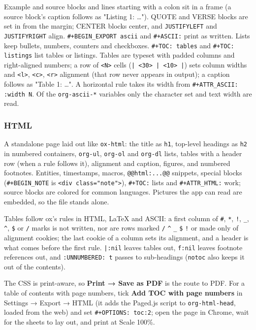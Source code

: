 \documentclass[11pt]{article}
\begin{document}
Example and source blocks and lines starting with a colon sit in a frame (a source block's caption follows as "Listing 1: …"). QUOTE and VERSE blocks are set in from the margin; CENTER blocks center, and \texttt{JUSTIFYLEFT} and \texttt{JUSTIFYRIGHT} align. \texttt{\#+BEGIN\_EXPORT ascii} and \texttt{\#+ASCII:} print as written. Lists keep bullets, numbers, counters and checkboxes. \texttt{\#+TOC: tables} and \texttt{\#+TOC: listings} list tables or listings. Tables are typeset with padded columns and right-aligned numbers; a row of \texttt{<N>} cells (\texttt{| <30> | <10> |}) sets column widths and \texttt{<l>}, \texttt{<c>}, \texttt{<r>} alignment (that row never appears in output); a caption follows as "Table 1: …". A horizontal rule takes its width from \texttt{\#+ATTR\_ASCII: :width N}. Of the \texttt{org-ascii-*} variables only the character set and text width are read.

\subsubsection{HTML}
\label{sec:org8a98de1}

A standalone page laid out like \texttt{ox-html}: the title as \texttt{h1}, top-level headings as \texttt{h2} in numbered containers, \texttt{org-ul}, \texttt{org-ol} and \texttt{org-dl} lists, tables with a header row (when a rule follows it), alignment and caption, figures, and numbered footnotes. Entities, timestamps, macros, \texttt{@@html:...@@} snippets, special blocks (\texttt{\#+BEGIN\_NOTE} is \texttt{<div class="note">}), \texttt{\#+TOC:} lists and \texttt{\#+ATTR\_HTML:} work; source blocks are colored for common languages. Pictures the app can read are embedded, so the file stands alone.

Tables follow ox's rules in HTML, \LaTeX{} and ASCII: a first column of \texttt{\#}, \texttt{*}, \texttt{!}, \texttt{\_}, \texttt{\textasciicircum{}}, \texttt{\$} or \texttt{/} marks is not written, nor are rows marked \texttt{/} \texttt{\textasciicircum{}} \texttt{\_} \texttt{\$} \texttt{!} or made only of alignment cookies; the last cookie of a column sets its alignment, and a header is what comes before the first rule. \texttt{|:nil} leaves tables out, \texttt{f:nil} leaves footnote references out, and \texttt{:UNNUMBERED: t} passes to sub-headings (\texttt{notoc} also keeps it out of the contents).

The CSS is print-aware, so \textbf{Print → Save as PDF} is the route to PDF. For a table of contents with page numbers, tick \textbf{Add TOC with page numbers} in Settings → Export → HTML (it adds the Paged.js script to \texttt{org-html-head}, loaded from the web) and set \texttt{\#+OPTIONS: toc:2}; open the page in Chrome, wait for the sheets to lay out, and print at Scale 100\%.
\end{document}
